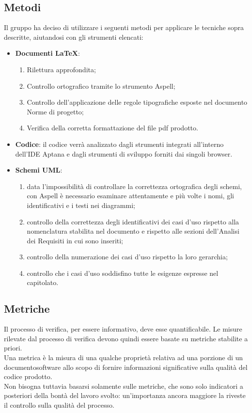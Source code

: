 {\subsection{Metodi}{
	\label{sec:Metodi}
	Il gruppo ha deciso di utilizzare i seguenti metodi per applicare le tecniche sopra descritte, aiutandosi con gli strumenti elencati:
	\begin{itemize}
		\item \textbf{Documenti \LaTeX}:
		\begin{enumerate}
			\item Rilettura approfondita;
			\item Controllo ortografico tramite lo strumento Aspell;
			\item Controllo dell'applicazione delle regole tipografiche esposte nel documento Norme di progetto;
			\item Verifica della corretta formattazione del file pdf prodotto.
		\end{enumerate}
		
		\item \textbf{Codice}: il codice verrà analizzato dagli strumenti integrati all'interno dell'IDE Aptana e dagli strumenti di sviluppo forniti dai singoli browser.
		
		\item \textbf{Schemi UML}:
		\begin{enumerate}
			\item data l'impossibilità di controllare la correttezza ortografica degli schemi, con Aspell è necessario esaminare attentamente e più volte i nomi, gli identificativi e i testi nei diagrammi;
			\item controllo della correttezza degli identificativi dei casi d'uso rispetto alla nomenclatura stabilita nel documento \NormeDiProgetto e rispetto alle sezioni dell'Analisi dei Requisiti in cui sono inseriti;
			\item controllo della numerazione dei casi d'uso rispetto la loro gerarchia;
			\item controllo che i casi d'uso soddisfino tutte le esigenze espresse nel capitolato.
		\end{enumerate}
	\end{itemize}
	}
\subsection{Metriche}{
	\label{sec:metriche}
	Il processo di verifica, per essere informativo, deve esse quantificabile. Le misure rilevate dal processo di verifica devono quindi essere basate su metriche stabilite a priori. \\
	Una metrica è la misura di una qualche proprietà relativa ad una porzione di un documentosoftware allo scopo di fornire informazioni significative sulla qualità del codice prodotto. \\
	Non bisogna tuttavia basarsi solamente sulle metriche, che sono solo indicatori a posteriori della bontà del lavoro svolto: un'importanza ancora maggiore la riveste il controllo sulla qualità del processo.
	}
}
